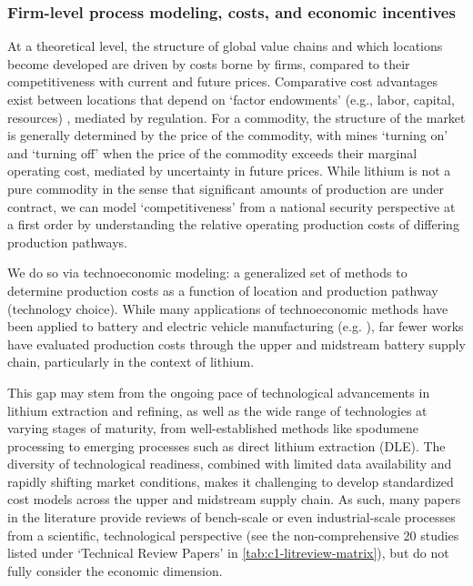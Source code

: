 \documentclass{article}
\renewcommand\_{\textunderscore\allowbreak}
\begin{document}
\onehalfspacing

\subsubsection{Firm-level process modeling, costs, and economic incentives}\label{app:04-litreview-incentives}

At a theoretical level, the structure of global value chains and which locations become developed are driven by costs borne by firms, compared to their competitiveness with current and future prices. Comparative cost advantages exist between locations that depend on `factor endowments' (e.g., labor, capital, resources) \cite{ricardoForeignTrade1817, leamerHeckscherOhlinModelTheory1995}, mediated by regulation. For a commodity, the structure of the market is generally determined by the price of the commodity, with mines `turning on' and `turning off' when the price of the commodity exceeds their marginal operating cost, mediated by uncertainty in future prices. While lithium is not a pure commodity in the sense that significant amounts of production are under contract, we can model `competitiveness' from a national security perspective at a first order by understanding the relative operating production costs of differing production pathways.

We do so via technoeconomic modeling: a generalized set of methods to determine production costs as a function of location and production pathway (technology choice). While many applications of technoeconomic methods have been applied to battery and electric vehicle manufacturing (e.g. \cite{duffnerBatteryCostModeling2020, saktiTechnoeconomicAnalysisOptimization2015, orangiTechnoEconomicModelBenchmarking2022}), far fewer works have evaluated production costs through the upper and midstream battery supply chain, particularly in the context of lithium.

This gap may stem from the ongoing pace of technological advancements in lithium extraction and refining, as well as the wide range of technologies at varying stages of maturity, from well-established methods like spodumene processing to emerging processes such as direct lithium extraction (DLE). The diversity of technological readiness, combined with limited data availability and rapidly shifting market conditions, makes it challenging to develop standardized cost models across the upper and midstream supply chain. As such, many papers in the literature provide reviews of bench-scale or even industrial-scale processes from a scientific, technological perspective (see the non-comprehensive 20 studies listed under `Technical Review Papers' in \ref{tab:c1-litreview-matrix}), but do not fully consider the economic dimension.
\end{document}
